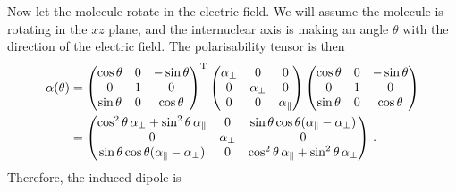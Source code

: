 \documentclass{article}
\theoremstyle{plain}\theoremheaderfont{\normalfont\itshape}\theorembodyfont{\rmfamily}\theoremseparator{.}\newtheorem*{rem}{Remark}\newtheorem*{ex}{Example}\newtheorem*{proof}{Proof}\newtheorem*{altp}{Alternative proof}
\theoremstyle{plain}\theoremheaderfont{\normalfont\bfseries}\theorembodyfont{\rmfamily}\theoremseparator{.}\newtheorem{thm}{Theorem}[section]\newtheorem{lem}[thm]{Lemma}\newtheorem{prop}[thm]{Proposition}\newtheorem*{cor}{Corollary}\newtheorem{defn}[thm]{Definition}\newtheorem{clm}[thm]{Claim}\newtheorem{clminproof}{Claim}\newtheorem{pos}{Postulate}[section]
\theoremstyle{break}\theoremheaderfont{\normalfont\itshape}\theorembodyfont{\rmfamily}\theoremseparator{.\medskip}\newtheorem*{proofskip}{Proof}\newtheorem*{exs}{Examples}\newtheorem*{rems}{Remarks}
\theoremstyle{break}\theoremheaderfont{\normalfont\bfseries}\theorembodyfont{\rmfamily}\theoremseparator{.\medskip}\newtheorem{lemskip}[thm]{Lemma}\newtheorem{defnskip}[thm]{Definition}\newtheorem{propskip}[thm]{Proposition}\newtheorem{thmskip}[thm]{Theorem}
\numberwithin{equation}{section}
\newcommand{\tp}{^\mathrm{T}}
\begin{document}
    Now let the molecule rotate in the electric field. We will assume the molecule is rotating in the \(xz\) plane, and the internuclear axis is making an angle \(\theta\) with the direction of the electric field. The polarisability tensor is then 
    \begin{align}
        \alpha(\theta)&=\begin{pmatrix}
            \cos\theta & 0 & -\sin\theta \\
            0 & 1 & 0 \\
            \sin\theta & 0 & \cos\theta
        \end{pmatrix}\tp\begin{pmatrix}
            \alpha_\perp & 0 & 0\\
            0 & \alpha_\perp & 0\\
            0 & 0 & \alpha_\parallel
        \end{pmatrix}\begin{pmatrix}
            \cos\theta & 0 & -\sin\theta \\
            0 & 1 & 0 \\
            \sin\theta & 0 & \cos\theta
        \end{pmatrix}\notag\\
        &=\begin{pmatrix}
            \cos^2\theta\,\alpha_\perp+\sin^2\theta\,\alpha_\parallel & 0 & \sin\theta\cos\theta(\alpha_\parallel-\alpha_\perp) \\
            0 & \alpha_\perp & 0 \\
            \sin\theta\cos\theta(\alpha_\parallel-\alpha_\perp) & 0 & \cos^2\theta\,\alpha_\parallel+\sin^2\theta\,\alpha_\perp
        \end{pmatrix}\,.
    \end{align}
    Therefore, the induced dipole is
\end{document}

